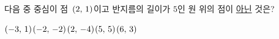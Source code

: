 다음 중 중심이 점~$(2,\mkern3mu 1)$이고 반지름의 길이가 $5$인 원 위의 점이 \underline{아닌} 것은?
\begin{choices32}{$(-3,\mkern3mu 1)$}{$(-2,\mkern3mu -2)$}{$(2,\mkern3mu -4)$}{$(5,\mkern3mu 5)$}{$(6,\mkern3mu 3)$}\end{choices32}
